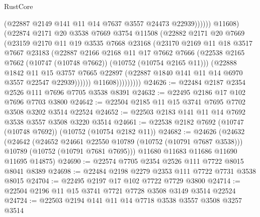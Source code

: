 \begin{lexlean}{RustCore}
\begin{coremodule}
                                (@22887 @2149 @141 @11 @14 @7637 @3557 @24473 @22939))))))
                      @11608)
                    (@22874
                      @2171
                      @20
                      @3538
                      @7669
                      @3754
                      @11508
                      (@22882
                        @2171
                        @20
                        @7669
                        (@23159
                          @2170
                          @11
                          @19
                          @3535
                          @7668
                          @23168
                          (@23170
                            @2169
                            @11
                            @18
                            @3517
                            @7667
                            @23183
                            (@22887
                              @2166
                              @2168
                              @11
                              @17
                              @7662
                              @7666
                              (@22538
                                @2165
                                @7662
                                (@10747 (@10748 @7662))
                                (@10752 (@10754 @2165 @11)))
                              (@22888
                                @1842
                                @11
                                @15
                                @3757
                                @7665
                                @22897
                                (@22887 @1840 @141 @11 @14 @6970 @3557 @22547 @22939))))))
                      @11608)))))))))
@24626 := @22484 @2187 @2354 @2526 @111 @7696 @7705 @3538 @8391
@24632 := @22495 @2186 @17 @102 @7696 @7703 @3800
@24642 := @22504 @2185 @11 @15 @3741 @7695 @7702 @3508 @3202 @3514 @22524
@24652 := @22503 @2183 @141 @11 @14 @7692 @3538 @3557 @3508 @3220 @3514
@24661 := @22538 @2182 @7692 (@10747 (@10748 @7692)) (@10752 (@10754 @2182 @11))
@24682 := @24626
    (@24632
      (@24642
        (@24652 @24661 @22550 @10789 (@10752 (@10791 @7687 @3538)))
        @10789
        (@10752 (@10791 @7681 @7695)))
      @11680
      @11683
      @11686
      @11690
      @11695
      @14875)
@24690 := @22574 @7705 @2354 @2526 @111 @7722 @8015 @8041 @8389
@24698 := @22484 @2198 @2279 @2353 @111 @7722 @7731 @3538 @8015
@24704 := @22495 @2197 @17 @102 @7722 @7729 @3800
@24714 := @22504 @2196 @11 @15 @3741 @7721 @7728 @3508 @3149 @3514 @22524
@24724 := @22503 @2194 @141 @11 @14 @7718 @3538 @3557 @3508 @3257 @3514

\end{coremodule}
\end{lexlean}
